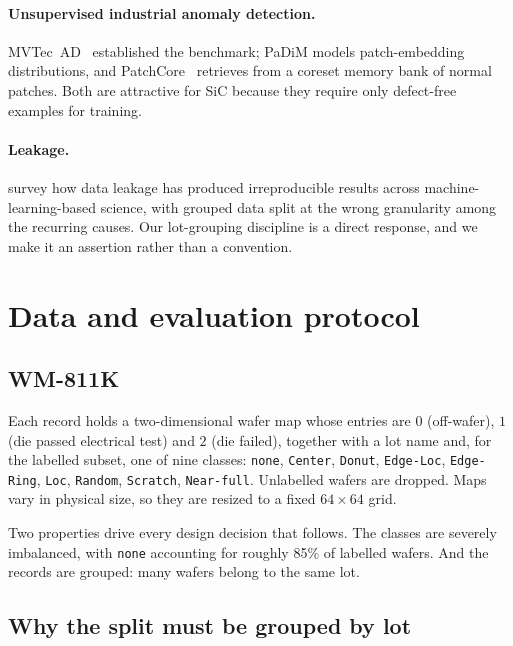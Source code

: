 \documentclass[11pt,a4paper]{article}
\begin{document}
\paragraph{Unsupervised industrial anomaly detection.}
MVTec~AD~\citep{bergmann2019mvtec} established the benchmark; PaDiM
\citep{defard2021padim} models patch-embedding distributions, and
PatchCore~\citep{roth2022patchcore} retrieves from a coreset memory bank of
normal patches. Both are attractive for SiC because they require only
defect-free examples for training.

\paragraph{Leakage.}
\citet{kapoor2023leakage} survey how data leakage has produced
irreproducible results across machine-learning-based science, with grouped
data split at the wrong granularity among the recurring causes. Our
lot-grouping discipline is a direct response, and we make it an assertion
rather than a convention.

\section{Data and evaluation protocol}

\subsection{WM-811K}

Each record holds a two-dimensional wafer map whose entries are
$0$ (off-wafer), $1$ (die passed electrical test) and $2$ (die failed),
together with a lot name and, for the labelled subset, one of nine classes:
\texttt{none}, \texttt{Center}, \texttt{Donut}, \texttt{Edge-Loc},
\texttt{Edge-Ring}, \texttt{Loc}, \texttt{Random}, \texttt{Scratch},
\texttt{Near-full}. Unlabelled wafers are dropped. Maps vary in physical size,
so they are resized to a fixed $64\times64$ grid.

Two properties drive every design decision that follows. The classes are
severely imbalanced, with \texttt{none} accounting for roughly 85\% of labelled
wafers. And the records are grouped: many wafers belong to the same lot.

\subsection{Why the split must be grouped by lot}
\label{sec:splitting}
\end{document}
